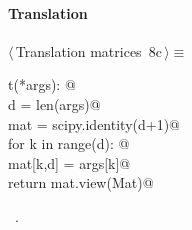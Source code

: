\documentclass[11pt,oneside]{article}	%
\begin{document}
\paragraph{Translation}
\begin{flushleft} \small \label{scrap19}
\protect{}$\langle\,$Translation matrices\nobreak\ {\footnotesize 8c}$\,\rangle\equiv$
\vspace{-1ex}
\begin{list}{}{} \item
\mbox{}\verb@def t(*args): @\\
\mbox{}\verb@   d = len(args)@\\
\mbox{}\verb@   mat = scipy.identity(d+1)@\\
\mbox{}\verb@   for k in range(d): @\\
\mbox{}\verb@      mat[k,d] = args[k]@\\
\mbox{}\verb@   return mat.view(Mat)@\\
\mbox{}\verb@@{\NWsep}
\end{list}
\vspace{-1ex}
\footnotesize\addtolength{\baselineskip}{-1ex}
\begin{list}{}{\setlength{\itemsep}{-\parsep}\setlength{\itemindent}{-\leftmargin}}
\item \NWtxtMacroRefIn\ .
\end{list}
\end{flushleft}
\end{document}
